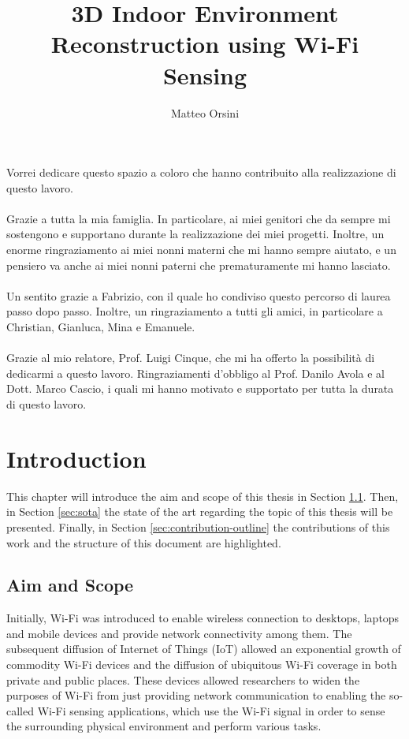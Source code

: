 \documentclass[binding=0.6cm,noexaminfo]{sapthesis}
\title{3D Indoor Environment Reconstruction using Wi-Fi Sensing}
\author{Matteo Orsini}
\begin{document}
\frontmatter
\maketitle

\begin{acknowledgments}
Vorrei dedicare questo spazio a coloro che hanno contribuito alla realizzazione di questo lavoro.
\\\\
Grazie a tutta la mia famiglia. In particolare, ai miei genitori che da sempre mi sostengono e supportano durante la realizzazione dei miei progetti. Inoltre, un enorme ringraziamento ai miei nonni materni che mi hanno sempre aiutato, e un pensiero va anche ai miei nonni paterni che prematuramente mi hanno lasciato.
\\\\
Un sentito grazie a Fabrizio, con il quale ho condiviso questo percorso di laurea passo dopo passo. Inoltre, un ringraziamento a tutti gli amici, in particolare a Christian, Gianluca, Mina e Emanuele.
\\\\
Grazie al mio relatore, Prof. Luigi Cinque, che mi ha offerto la possibilità di dedicarmi a questo lavoro. Ringraziamenti d'obbligo al Prof. Danilo Avola e al Dott. Marco Cascio, i quali mi hanno motivato e supportato per tutta la durata di questo lavoro.
\end{acknowledgments}

\tableofcontents
\mainmatter

\chapter{Introduction}

This chapter will introduce the aim and scope of this thesis in Section \ref{sec:aim-scope}. Then, in Section \ref{sec:sota} the state of the art regarding the topic of this thesis will be presented. Finally, in Section \ref{sec:contribution-outline} the contributions of this work and the structure of this document are highlighted.

\section{Aim and Scope}\label{sec:aim-scope}
Initially, Wi-Fi was introduced to enable wireless connection to desktops, laptops and mobile devices and provide network connectivity among them. The subsequent diffusion of Internet of Things (IoT) allowed an exponential growth of commodity Wi-Fi devices and the diffusion of ubiquitous Wi-Fi coverage in both private and public places.
These devices allowed researchers to widen the purposes of Wi-Fi from just providing network communication to enabling the so-called Wi-Fi sensing applications, which use the Wi-Fi signal in order to sense the surrounding physical environment and perform various tasks.
\end{document}
